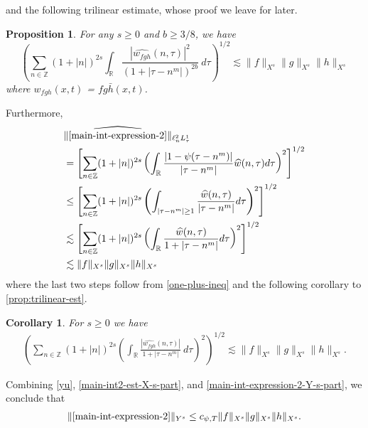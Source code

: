 \documentclass[12pt,reqno]{amsart}
\numberwithin{equation}{section}  %
\numberwithin{figure}{section}
\newcommand{\rr}{\mathbb{R}}
\newcommand{\zz}{\mathbb{Z}}
\newcommand{\wh}{\widehat}
\theoremstyle{plain}
\newtheorem{proposition}{Proposition}
\newtheorem{corollary}{Corollary}
\theoremstyle{definition}
\theoremstyle{remark}
\begin{document}
%
%
and the following trilinear estimate, whose proof we leave for later.
%
%
%
%
%
%
%
%
\begin{proposition}
\label{prop:trilinear-est}
	For any $s \ge 0$ and $b \ge 3/8$, we have
	\begin{equation}
		\left( \sum_{n \in \zz} \left (1 + |n| \right )^{2s} \int_\rr
		\frac{|\wh{w_{fgh}}(n, \tau) |^2}{\left (1+ |\tau - 
    n^{m}| \right )^{2b}} 
		 \ d \tau 
		\right)^{1/2}
		\lesssim \|f\|_{X^s} \|g\|_{X^s}\|h\|_{X^s}
	\end{equation}
	where $w_{fgh}(x,t)$ = $fg \bar h (x,t)$.
%
%
%
%
\end{proposition}
%
%
Furthermore,
%
%
%
%
\begin{equation}
	\label{main-int-expression-2-Y-s-part}
	\begin{split}
    & \| \wh{\eqref{main-int-expression-2}}\|_{\ell^{2}_{n}L^{1}_{\tau}}
		\\
    & = \left[ \sum_{n \in \zz}(1 + | n |)^{2s} \left(
		\int_{\rr}\frac{|1 - \psi(\tau - n^{m})|}{|\tau - n^{m}|} \wh{w}(n, \tau) d
		\tau \right)^{2} \right]^{1/2}
		\\
    & \le \left[ \sum_{n \in \zz}(1 + | n |)^{2s} \left(
    \int_{| \tau - n^{m} | \ge 1 }\frac{\wh{w}(n, \tau)}{|\tau - n^{m}|}  d
		\tau \right)^{2} \right]^{1/2}
    \\
    & \lesssim \left[ \sum_{n \in \zz}(1 + | n |)^{2s} \left(
    \int_{\rr}\frac{\wh{w}(n, \tau)}{1 + |\tau - n^{m}|}  d
		\tau \right)^{2} \right]^{1/2}
    \\
		& \lesssim \|f\|_{X^s} \|g\|_{X^s}\|h\|_{X^s}
	\end{split}
\end{equation}
%
%
where the last two steps follow from \eqref{one-plus-ineq} and the following
corollary to \autoref{prop:trilinear-est}.
%
%
%
%
%
%
%
%
\begin{corollary}
\label{cor:trilinear-estimate2}
	For $s \ge 0$ we have
%
%
\begin{equation}
	\label{trilinear-estimate2}
	\begin{split}
		\left( \sum_{n \in \zz} \left (1 + |n| \right )^{2s}  \left ( \int_\rr 
		\frac{|\wh{w_{fgh}}(n, \tau) |}{1 + | \tau - n^{m } |}
		 \ d\tau \right)^2  \right)^{1/2} \lesssim \|f\|_{X^s} \|g\|_{X^s}\|h\|_{X^s}.
	\end{split}
\end{equation}
\end{corollary}
%
%
Combining \eqref{yu}, \eqref{main-int2-est-X-s-part}, and
\eqref{main-int-expression-2-Y-s-part}, we conclude that
%
%
%
%
\begin{equation}
	\label{main-int2-est}
	\begin{split}
		\|\eqref{main-int-expression-2}\|_{Y^s} \le c_{\psi, T}\|f\|_{X^s} \|g\|_{X^s}\|h\|_{X^s}.
	\end{split}
\end{equation}
%
%
\end{document}
